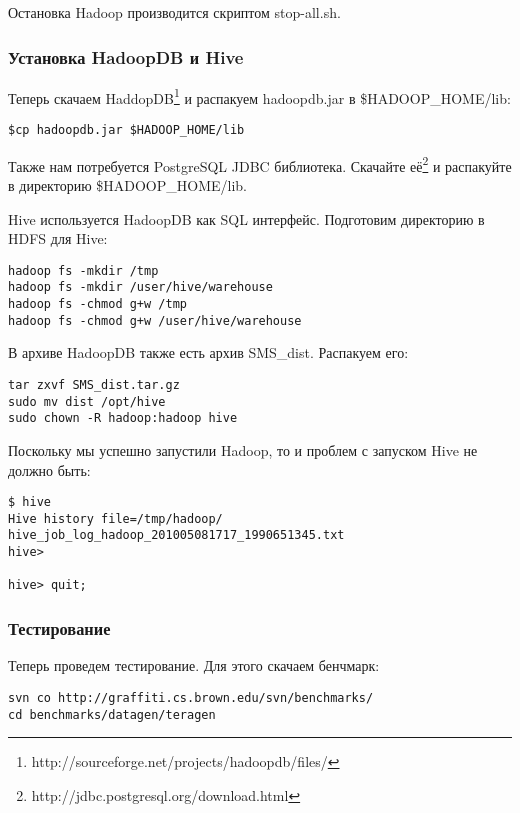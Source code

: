 Остановка Hadoop производится скриптом stop-all.sh.

\subsubsection{Установка HadoopDB и Hive}
Теперь скачаем HaddopDB\footnote{http://sourceforge.net/projects/hadoopdb/files/} и распакуем hadoopdb.jar в \$HADOOP\_HOME/lib:
\begin{lstlisting}[label=lst:haddop15,caption=Установка HadoopDB]
$cp hadoopdb.jar $HADOOP_HOME/lib
\end{lstlisting}

Также нам потребуется PostgreSQL JDBC библиотека. Скачайте её\footnote{http://jdbc.postgresql.org/download.html} и 
распакуйте в директорию \$HADOOP\_HOME/lib.

Hive используется HadoopDB как SQL интерфейс. Подготовим директорию в HDFS для Hive:
\begin{lstlisting}[label=lst:haddop16,caption=Установка HadoopDB]
hadoop fs -mkdir /tmp
hadoop fs -mkdir /user/hive/warehouse
hadoop fs -chmod g+w /tmp
hadoop fs -chmod g+w /user/hive/warehouse
\end{lstlisting}

В архиве HadoopDB также есть архив SMS\_dist. Распакуем его:
\begin{lstlisting}[label=lst:haddop17,caption=Установка HadoopDB]
tar zxvf SMS_dist.tar.gz
sudo mv dist /opt/hive
sudo chown -R hadoop:hadoop hive
\end{lstlisting}

Поскольку мы успешно запустили Hadoop, то и проблем с запуском Hive не должно быть:
\begin{lstlisting}[label=lst:haddop18,caption=Установка HadoopDB]
$ hive
Hive history file=/tmp/hadoop/
hive_job_log_hadoop_201005081717_1990651345.txt
hive> 

hive> quit;
\end{lstlisting}

\subsubsection{Тестирование}
Теперь проведем тестирование. Для этого скачаем бенчмарк:
\begin{lstlisting}[label=lst:haddop19,caption=Тестирование]
svn co http://graffiti.cs.brown.edu/svn/benchmarks/
cd benchmarks/datagen/teragen
\end{lstlisting}

